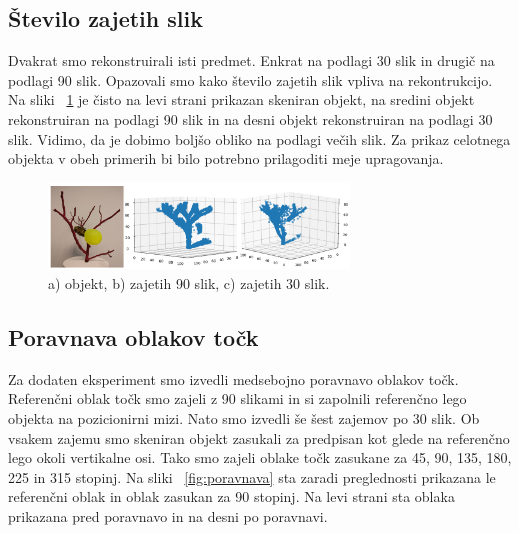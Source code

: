 \documentclass[journal,a4paper,twoside]{sty/IEEEtran}
\begin{document}
\subsection{Število zajetih slik}
Dvakrat smo rekonstruirali isti predmet. Enkrat na podlagi 30 slik in drugič na podlagi 90 slik. Opazovali smo kako število zajetih slik vpliva na rekontrukcijo. Na sliki ~\ref{fig:slika_90_30} je čisto na levi strani prikazan skeniran objekt, na sredini objekt rekonstruiran na podlagi 90 slik in na desni objekt rekonstruiran na podlagi 30 slik. Vidimo, da je dobimo boljšo obliko na podlagi večih slik. Za prikaz celotnega objekta v obeh primerih bi bilo potrebno prilagoditi meje upragovanja. 
%
\begin{figure}[H]
	\centerline{\includegraphics[width=8cm]{fig/slika_90_30}}
	\caption{a) objekt, b) zajetih 90 slik, c) zajetih 30 slik.}
	\label{fig:slika_90_30}
\end{figure}
%
%
\subsection{Poravnava oblakov točk}
Za dodaten eksperiment smo izvedli medsebojno poravnavo oblakov točk. Referenčni oblak točk smo zajeli z 90 slikami in si zapolnili referenčno lego objekta na pozicionirni mizi. Nato smo izvedli še šest zajemov po 30 slik. Ob vsakem zajemu smo skeniran objekt zasukali za predpisan kot glede na referenčno lego okoli vertikalne osi. Tako smo zajeli oblake točk zasukane za 45, 90, 135, 180, 225 in 315 stopinj. Na sliki ~\ref{fig:poravnava} sta zaradi preglednosti prikazana le referenčni oblak in oblak zasukan za 90 stopinj. Na levi strani sta oblaka prikazana pred poravnavo in na desni po poravnavi. 
\end{document}

